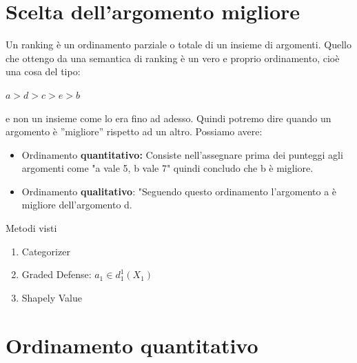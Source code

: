     \section{Scelta dell'argomento migliore}
    Un ranking è un ordinamento parziale o totale di un insieme di argomenti.
    Quello che ottengo da una semantica di ranking è un vero e proprio
    ordinamento, cioè una cosa del tipo:
    \begin{center}
        $a > d > c > e >b$
    \end{center}
    e non un insieme come lo era fino ad adesso. Quindi potremo dire quando un
    argomento è ”migliore” rispetto ad un altro. Possiamo avere:
    \begin{itemize}
        \item Ordinamento \textbf{quantitativo:} Consiste nell'assegnare prima
              dei punteggi agli argomenti come "a vale 5, b vale 7" quindi concludo
              che b è migliore.
        \item Ordinamento \textbf{qualitativo}: "Seguendo questo ordinamento
              l'argomento a è migliore dell'argomento d.
    \end{itemize}
    \begin{center}
        Metodi visti
    \end{center}
    \begin{enumerate}
        \item Categorizer
        \item Graded Defense: $a_1 \in d^1_{1} (X_1)$
        \item Shapely Value
    \end{enumerate}
    \section{Ordinamento quantitativo}

